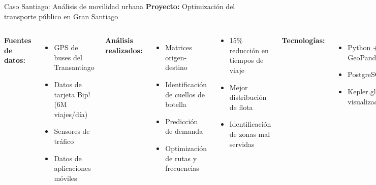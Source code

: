 \documentclass[10pt]{beamer}
\newcommand{\examplebox}[2]{
\begin{tcolorbox}[colframe=usachblue,colback=white,title=#1]
#2
\end{tcolorbox}
}
\begin{document}
\begin{frame}{Caso Santiago: Análisis de movilidad urbana}
    \textbf{Proyecto:} Optimización del transporte público en Gran Santiago
    
    \begin{columns}
        \textbf{Fuentes de datos:}
        \begin{itemize}
            \item GPS de buses del Transantiago
            \item Datos de tarjeta Bip! (6M viajes/día)
            \item Sensores de tráfico
            \item Datos de aplicaciones móviles
        \end{itemize}
        
        \textbf{Análisis realizados:}
        \begin{itemize}
            \item Matrices origen-destino
            \item Identificación de cuellos de botella
            \item Predicción de demanda
            \item Optimización de rutas y frecuencias
        \end{itemize}
        
        \examplebox{Resultados:}{
            \begin{itemize}
                \item 15\% reducción en tiempos de viaje
                \item Mejor distribución de flota
                \item Identificación de zonas mal servidas
            \end{itemize}
        }
        
        \textbf{Tecnologías:}
        \begin{itemize}
            \item Python + GeoPandas
            \item PostgreSQL/PostGIS
            \item Kepler.gl para visualización
        \end{itemize}
    \end{columns}
\end{frame}
\end{document}

